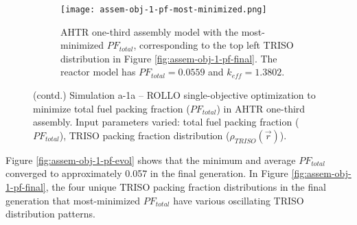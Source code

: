 \begin{figure}[htbp!]
    \ContinuedFloat
    \begin{subfigure}{.8\textwidth}
        \centering
        \texttt{[image: assem-obj-1-pf-most-minimized.png]}
        \caption{\gls{AHTR} one-third assembly model with the most-minimized 
        $PF_{total}$, corresponding to the top left TRISO distribution in Figure 
        \ref{fig:assem-obj-1-pf-final}. The reactor model has $PF_{total}=0.0559$
        and $k_{eff}=1.3802$.}
    \end{subfigure}
    \begin{subfigure}{.2\textwidth}
        \vspace{1cm}
    \end{subfigure}
    \label{fig:assem-obj-1-pf-most-minimized} 
    \caption{(contd.) Simulation a-1a -- ROLLO single-objective optimization to minimize total 
    fuel packing fraction ($PF_{total}$) in \gls{AHTR} one-third assembly. 
    Input parameters varied: total fuel packing fraction 
    ($PF_{total}$), \gls{TRISO} packing fraction distribution ($\rho_{TRISO}(\vec{r})$).}
\end{figure}

Figure \ref{fig:assem-obj-1-pf-evol} shows that the minimum and average $PF_{total}$ 
converged to approximately 0.057 in the final generation. 
In Figure \ref{fig:assem-obj-1-pf-final}, the four unique TRISO packing fraction 
distributions in the final generation that most-minimized $PF_{total}$ have various 
oscillating TRISO distribution patterns. 

